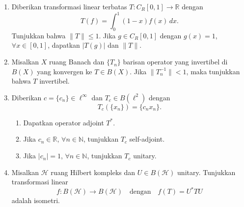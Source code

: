 \documentclass{article}
\theoremstyle{definition}
\begin{document}
  \pagestyle{fancy}

  \begin{enumerate}
    \item Diberikan transformasi linear terbatas \( T : C_R[0,1] \to \mathbb{R} \) dengan 
    \[
        T(f) = \int_0^1 (1 - x)f(x)\, dx.
    \]
    Tunjukkan bahwa \( \|T\| \leq 1 \). Jika \( g \in C_R[0,1] \) dengan \( g(x) = 1 \), \( \forall x \in [0,1] \), dapatkan \( |T(g)| \) dan \( \|T\| \).

    \item Misalkan \( X \) ruang Banach dan \( \{T_n\} \) barisan operator yang invertibel di \( B(X) \) yang konvergen ke \( T \in B(X) \). Jika \( \|T_n^{-1}\| < 1 \), maka tunjukkan bahwa \( T \) invertibel.

    \item Diberikan \( c = \{c_n\} \in \ell^\infty \) dan \( T_c \in B(\ell^2) \) dengan 
    \[
        T_c(\{x_n\}) = \{c_n x_n\}.
    \]
    \begin{enumerate}
        \item Dapatkan operator adjoint \( T^* \).
        \item Jika \( c_n \in \mathbb{R} \), \( \forall n \in \mathbb{N} \), tunjukkan \( T_c \) self-adjoint.
        \item Jika \( |c_n| = 1 \), \( \forall n \in \mathbb{N} \), tunjukkan \( T_c \) unitary.
    \end{enumerate}

    \item Misalkan \( \mathcal{H} \) ruang Hilbert kompleks dan \( U \in B(\mathcal{H}) \) unitary. Tunjukkan transformasi linear 
    \[
        f : B(\mathcal{H}) \to B(\mathcal{H}) \quad \text{dengan} \quad f(T) = U^*TU
    \]
    adalah isometri.
\end{enumerate}
\end{document}
